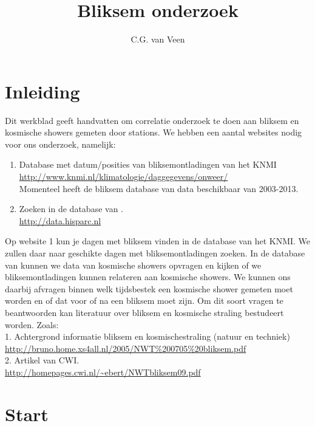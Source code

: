 

\title{Bliksem onderzoek}
\author{C.G. van Veen}



\maketitle

\section{Inleiding}

Dit werkblad geeft handvatten om correlatie onderzoek te doen aan bliksem en
kosmische showers gemeten door \hisparc stations.
We hebben een aantal websites nodig voor ons onderzoek, namelijk:
\begin{enumerate}
    \item Database met datum/posities van bliksemontladingen van het KNMI\\
    \url{ http://www.knmi.nl/klimatologie/daggegevens/onweer/} \\
    Momenteel heeft de bliksem database van \hisparc data beschikbaar van 2003-2013.
    \item Zoeken in de database van \hisparc.\\
    \url{http://data.hisparc.nl}
\end{enumerate}

Op website 1 kun je dagen met bliksem vinden in de database van het KNMI.
We zullen daar naar geschikte dagen met bliksemontladingen zoeken.
In de database van \hisparc kunnen we data van kosmische showers opvragen en
kijken of we bliksemontladingen kunnen relateren aan kosmische showers.
We kunnen ons daarbij afvragen binnen welk tijdsbestek een kosmische shower gemeten
moet worden en of dat voor of na een bliksem moet zijn. Om dit soort vragen te
beantwoorden kan literatuur over bliksem en kosmische straling bestudeert worden.
Zoals:\\
1. Achtergrond informatie bliksem en kosmischestraling (natuur en techniek)\\
\url{http://bruno.home.xs4all.nl/2005/NWT%200705%20bliksem.pdf}\\
2. Artikel van CWI.\\
\url{http://homepages.cwi.nl/~ebert/NWTbliksem09.pdf}\\

\section{Start}

